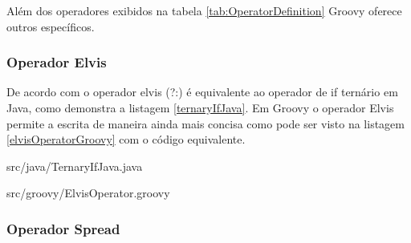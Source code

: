 \documentclass[12pt]{article}
\begin{document}
    Além dos operadores exibidos na tabela \ref{tab:OperatorDefinition} Groovy 
    oferece outros específicos.

\subsubsection{Operador Elvis}

    De acordo com \cite{beginingGroovy:2008} o operador elvis (?:) é equivalente
    ao operador de if ternário em Java, como demonstra a listagem \ref{ternaryIfJava}.
    Em Groovy o operador Elvis permite a escrita de maneira ainda mais concisa 
    como pode ser visto na listagem \ref{elvisOperatorGroovy} com o código equivalente.
    
    
                    {src/java/TernaryIfJava.java}
    
    
                    {src/groovy/ElvisOperator.groovy}
                    
\subsubsection{Operador Spread}
\end{document}
